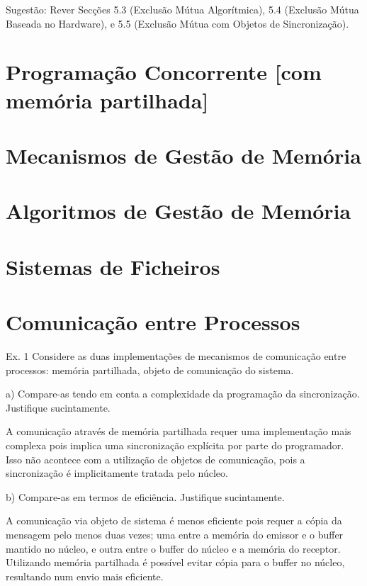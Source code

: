 \documentclass[11pt]{article}
\begin{document}
Sugestão: Rever Secções 5.3 (Exclusão Mútua Algorítmica), 5.4 (Exclusão Mútua Baseada no Hardware), e 5.5 (Exclusão Mútua com Objetos de Sincronização).

\newpage

\section{Programação Concorrente [com memória partilhada]}

\newpage

\section{Mecanismos de Gestão de Memória}

\newpage

\section{Algoritmos de Gestão de Memória}

\newpage

\section{Sistemas de Ficheiros}

\newpage

\section{Comunicação entre Processos}

Ex. 1 Considere as duas implementações de mecanismos de comunicação entre processos: memória partilhada, objeto de comunicação do sistema.

a) Compare-as tendo em conta a complexidade da programação da sincronização. Justifique sucintamente.

A comunicação através de memória partilhada requer uma implementação mais complexa pois implica uma sincronização explícita por parte do programador. Isso não acontece com a utilização de objetos de comunicação, pois a sincronização é implicitamente tratada pelo núcleo.

b) Compare-as em termos de eficiência. Justifique sucintamente.

A comunicação via objeto de sistema é menos eficiente pois requer a cópia da mensagem pelo menos duas vezes; uma entre a memória do emissor e o buffer mantido no núcleo, e outra entre o buffer do núcleo e a memória do receptor. Utilizando memória partilhada é possível evitar cópia para o buffer no núcleo, resultando num envio mais eficiente.
\end{document}
